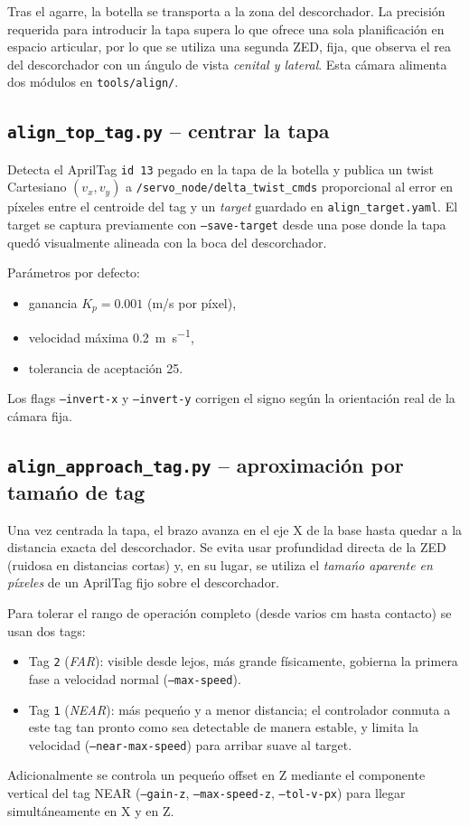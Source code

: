 \documentclass[conference]{IEEEtran}
\begin{document}
Tras el agarre, la botella se transporta a la zona del descorchador.
La precisi\'on requerida para introducir la tapa supera lo que ofrece
una sola planificaci\'on en espacio articular, por lo que se utiliza
una segunda ZED, fija, que observa el rea del descorchador con un
\'angulo de vista \emph{cenital y lateral}. Esta c\'amara alimenta dos
m\'odulos en \texttt{tools/align/}.

\subsection{\texttt{align\_top\_tag.py} -- centrar la tapa}

Detecta el AprilTag \texttt{id 13} pegado en la tapa de la botella y
publica un twist Cartesiano $(v_x, v_y)$ a
\texttt{/servo\_node/delta\_twist\_cmds} proporcional al error en
p\'ixeles entre el centroide del tag y un \emph{target} guardado en
\texttt{align\_target.yaml}. El target se captura previamente con
\texttt{--save-target} desde una pose donde la tapa qued\'o
visualmente alineada con la boca del descorchador.

Par\'ametros por defecto:
\begin{itemize}
  \item ganancia $K_p = 0.001$ (m/s por p\'ixel),
  \item velocidad m\'axima \SI{0.2}{\meter\per\second},
  \item tolerancia de aceptaci\'on \SI{25}{\pixel}.
\end{itemize}
Los flags \texttt{--invert-x} y \texttt{--invert-y} corrigen el signo
seg\'un la orientaci\'on real de la c\'amara fija.

\subsection{\texttt{align\_approach\_tag.py} -- aproximaci\'on por
            tama\'no de tag}

Una vez centrada la tapa, el brazo avanza en el eje X de la base hasta
quedar a la distancia exacta del descorchador. Se evita usar
profundidad directa de la ZED (ruidosa en distancias cortas) y, en su
lugar, se utiliza el \emph{tama\'no aparente en p\'ixeles} de un
AprilTag fijo sobre el descorchador.

Para tolerar el rango de operaci\'on completo (desde varios cm hasta
contacto) se usan dos tags:
\begin{itemize}
  \item Tag \texttt{2} (\emph{FAR}): visible desde lejos, m\'as
        grande f\'isicamente, gobierna la primera fase a velocidad
        normal (\texttt{--max-speed}).
  \item Tag \texttt{1} (\emph{NEAR}): m\'as peque\'no y a menor
        distancia; el controlador conmuta a este tag tan pronto como
        sea detectable de manera estable, y limita la velocidad
        (\texttt{--near-max-speed}) para arribar suave al target.
\end{itemize}
Adicionalmente se controla un peque\'no offset en Z mediante el
componente vertical del tag NEAR (\texttt{--gain-z},
\texttt{--max-speed-z}, \texttt{--tol-v-px}) para llegar
simult\'aneamente en X y en Z.
\end{document}
